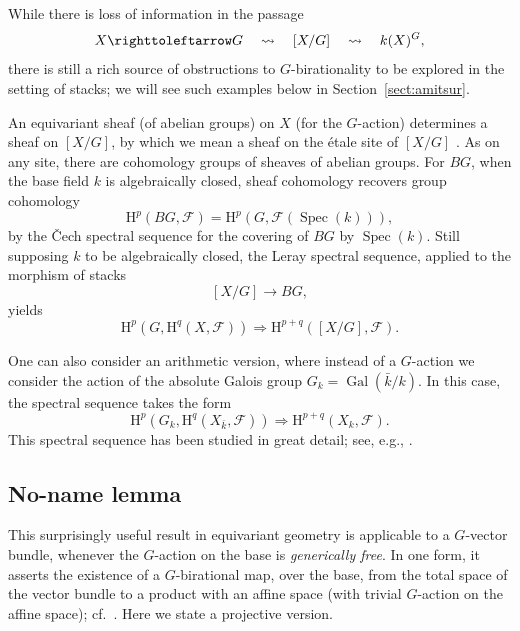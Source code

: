 \documentclass[12pt,reqno]{amsart}
\theoremstyle{plain}
\theoremstyle{remark}
\theoremstyle{definition}
\numberwithin{equation}{section}
\newcommand{\cF}{{\mathcal F}}
\newcommand{\rH}{{\mathrm H}}
\newcommand{\actsfromright}{\righttoleftarrow}
\DeclareMathOperator{\Gal}{Gal}
\DeclareMathOperator{\Spec}{Spec}
\begin{document}
While there is loss of information in the passage
$$
X\actsfromright G \quad \rightsquigarrow  \quad [X/G] \quad \rightsquigarrow  \quad  k(X)^G,
$$
there is still a rich source of obstructions to $G$-birationality to be explored in the setting of stacks; we will see such examples below in Section~\ref{sect:amitsur}. 

An equivariant sheaf (of abelian groups) on $X$ (for the $G$-action) determines a sheaf on $[X/G]$, by which we mean a sheaf on the \'etale site of $[X/G]$ \cite[Defn.\ 4.10]{DM}.
As on any site, there are cohomology groups of sheaves of abelian groups.
For $BG$, when the base field $k$ is algebraically closed, sheaf cohomology recovers group cohomology
\begin{equation}
\label{eqn.recovergroupcoho}
\rH^p(BG,\cF)=\rH^p(G,\cF(\Spec(k))),
\end{equation}
by the \v Cech spectral sequence for the covering of $BG$ by $\Spec(k)$.
Still supposing $k$ to be algebraically closed, the Leray spectral sequence,
applied to the morphism of stacks 
$$
[X/G] \to BG,
$$
yields
\begin{equation} 
\label{eqn:spectral}
\rH^p(G,\rH^q(X, \cF)) \Rightarrow \rH^{p+q}([X/G], \cF). 
\end{equation}

One can also consider an arithmetic version, where instead of a $G$-action we consider the action of the absolute Galois group $G_k=\Gal(\bar{k}/k)$. In this case, the spectral sequence takes the form
\begin{equation} 
\label{eqn:spectral-galois}
\rH^p(G_k,\rH^q(X_{\bar{k}}, \cF)) \Rightarrow \rH^{p+q}(X_k, \cF). 
\end{equation}
This spectral sequence has been studied in great detail; see, e.g., \cite[Sect.\ 1.5]{CTSansucDuke}. 





\subsection{No-name lemma}
\label{sect:noname}

This surprisingly useful result in equivariant geometry is applicable to a $G$-vector bundle, whenever the $G$-action on the base is \emph{generically free}.
In one form, it asserts the existence of a $G$-birational map, over the base, from the total space of the vector bundle to a product with an affine space (with trivial $G$-action on the affine space); cf.\ \cite[Lemma 4.4]{CGR}.
Here we state a projective version.
\end{document}
